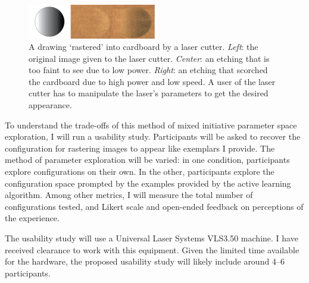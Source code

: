 \documentclass[12pt]{article}
\begin{document}
\begin{figure}
  \centering
  \includegraphics[width=0.5\textwidth]{figures/rasters}
  \caption{%
  A drawing `rastered' into cardboard by a laser cutter.
  \emph{Left}: the original image given to the laser cutter.
  \emph{Center}: an etching that is too faint to see due to low power.
  \emph{Right}: an etching that scorched the cardboard due to high power and low speed.
  A user of the laser cutter has to manipulate the laser's parameters to get the desired appearance.}
\label{fig:rasters}
\end{figure}

To understand the trade-offs of this method of mixed initiative parameter space exploration, I will run a usability study.
Participants will be asked to recover the configuration for rastering images to appear like exemplars I provide.
The method of parameter exploration will be varied:
in one condition, participants explore configurations on their own.
In the other, participants explore the configuration space prompted by the examples provided by the active learning algorithm.
Among other metrics, I will measure the total number of configurations tested, and Likert scale and open-ended feedback on perceptions of the experience.

The usability study will use a Universal Laser Systems VLS3.50 machine.
I have received clearance to work with this equipment.
Given the limited time available for the hardware, the proposed usability study will likely include around 4--6 participants.

\printbibliography[heading=none]
\end{document}
